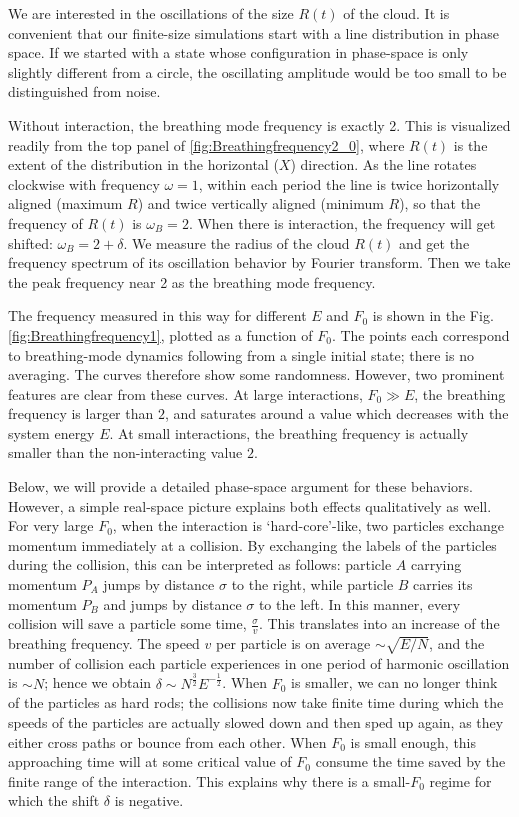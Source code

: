 \documentclass[aps,preprintnumbers,onecolumn,amsmath,amssymb,floatfix,pra]{revtex4-1}
\begin{document}
We are interested in the oscillations of the size $R(t)$ of the cloud.  It is convenient that our
finite-size simulations start with a line distribution in phase space.  If we started with a state
whose configuration in phase-space is only slightly different from a circle, the oscillating
amplitude would be too small to be distinguished from noise.

Without interaction, the breathing mode frequency is exactly 2.  This is visualized readily from the
top panel of \ref{fig:Breathingfrequency2_0}, where $R(t)$ is the extent of the distribution in the
horizontal ($X$) direction.  As the line rotates clockwise with frequency $\omega=1$, within each
period the line is twice horizontally aligned (maximum $R$) and twice vertically aligned (minimum
$R$), so that the frequency of $R(t)$ is $\omega_B=2$.  When there is interaction, the frequency
will get shifted: $\omega_B = 2+\delta$.  We measure the radius of the cloud $R(t)$ and get the
frequency spectrum of its oscillation behavior by Fourier transform. Then we take the peak frequency
near 2 as the breathing mode frequency.

The frequency measured in this way for different $E$ and $F_0$ is shown in the
Fig.\ref{fig:Breathingfrequency1}, plotted as a function of $F_0$.  The points each correspond to
breathing-mode dynamics following from a single initial state; there is no averaging.  The curves
therefore show some randomness.  However, two prominent features are clear from these curves.  At
large interactions, $F_0\gg E$, the breathing frequency is larger than $2$, and saturates around a
value which decreases with the system energy $E$.  At small interactions, the breathing frequency is
actually smaller than the non-interacting value $2$.   

Below, we will provide a detailed phase-space argument for these behaviors.  However, a simple
real-space picture explains both effects qualitatively as well.  For very large $F_0$, when the
interaction is `hard-core'-like, two particles exchange momentum immediately at a collision.  By
exchanging the labels of the particles during the collision, this can be interpreted as follows:
particle $A$ carrying momentum $P_A$ jumps by distance $\sigma$ to the right, while particle $B$
carries its momentum $P_B$ and jumps by distance $\sigma$ to the left.  In this manner, every
collision will save a particle some time, $\frac{\sigma}{v}$.  This translates into an increase of
the breathing frequency.  The speed $v$ per particle is on average $\sim\sqrt{E/N}$, and the number
of collision each particle experiences in one period of harmonic oscillation is $\sim N$; hence we
obtain $\delta\sim N^{\frac{3}{2}}E^{-\frac{1}{2}}$.  When $F_0$ is smaller, we can no longer think
of the particles as hard rods; the collisions now take finite time during which the speeds of the
particles are actually slowed down and then sped up again, as they either cross paths or bounce from
each other.  When $F_0$ is small enough, this approaching time will at some critical value of $F_0$
consume the time saved by the finite range of the interaction.  This explains why there is a
small-$F_0$ regime for which the shift $\delta$ is negative.
\end{document}
